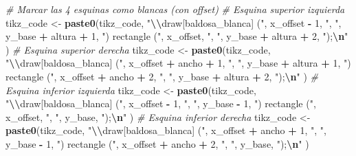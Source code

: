 \documentclass[
]{article}
\newenvironment{Shaded}{\begin{snugshade}}{\end{snugshade}}
\newcommand{\CommentTok}[1]{\textcolor[rgb]{0.56,0.35,0.01}{\textit{#1}}}
\newcommand{\DecValTok}[1]{\textcolor[rgb]{0.00,0.00,0.81}{#1}}
\newcommand{\FunctionTok}[1]{\textcolor[rgb]{0.13,0.29,0.53}{\textbf{#1}}}
\newcommand{\NormalTok}[1]{#1}
\newcommand{\OtherTok}[1]{\textcolor[rgb]{0.56,0.35,0.01}{#1}}
\newcommand{\SpecialCharTok}[1]{\textcolor[rgb]{0.81,0.36,0.00}{\textbf{#1}}}
\newcommand{\StringTok}[1]{\textcolor[rgb]{0.31,0.60,0.02}{#1}}
\begin{document}
\begin{Shaded}
\begin{Highlighting}[]
    \CommentTok{\# Marcar las 4 esquinas como blancas (con offset)}
    \CommentTok{\# Esquina superior izquierda}
\NormalTok{    tikz\_code }\OtherTok{\textless{}{-}} \FunctionTok{paste0}\NormalTok{(tikz\_code,}
      \StringTok{"}\SpecialCharTok{\textbackslash{}\textbackslash{}}\StringTok{draw[baldosa\_blanca] ("}\NormalTok{, x\_offset }\SpecialCharTok{{-}} \DecValTok{1}\NormalTok{, }\StringTok{", "}\NormalTok{, y\_base }\SpecialCharTok{+}\NormalTok{ altura }\SpecialCharTok{+} \DecValTok{1}\NormalTok{, }\StringTok{") rectangle ("}\NormalTok{, x\_offset, }\StringTok{", "}\NormalTok{, y\_base }\SpecialCharTok{+}\NormalTok{ altura }\SpecialCharTok{+} \DecValTok{2}\NormalTok{, }\StringTok{");}\SpecialCharTok{\textbackslash{}n}\StringTok{"}
\NormalTok{    )}
    \CommentTok{\# Esquina superior derecha}
\NormalTok{    tikz\_code }\OtherTok{\textless{}{-}} \FunctionTok{paste0}\NormalTok{(tikz\_code,}
      \StringTok{"}\SpecialCharTok{\textbackslash{}\textbackslash{}}\StringTok{draw[baldosa\_blanca] ("}\NormalTok{, x\_offset }\SpecialCharTok{+}\NormalTok{ ancho }\SpecialCharTok{+} \DecValTok{1}\NormalTok{, }\StringTok{", "}\NormalTok{, y\_base }\SpecialCharTok{+}\NormalTok{ altura }\SpecialCharTok{+} \DecValTok{1}\NormalTok{, }\StringTok{") rectangle ("}\NormalTok{, x\_offset }\SpecialCharTok{+}\NormalTok{ ancho }\SpecialCharTok{+} \DecValTok{2}\NormalTok{, }\StringTok{", "}\NormalTok{, y\_base }\SpecialCharTok{+}\NormalTok{ altura }\SpecialCharTok{+} \DecValTok{2}\NormalTok{, }\StringTok{");}\SpecialCharTok{\textbackslash{}n}\StringTok{"}
\NormalTok{    )}
    \CommentTok{\# Esquina inferior izquierda}
\NormalTok{    tikz\_code }\OtherTok{\textless{}{-}} \FunctionTok{paste0}\NormalTok{(tikz\_code,}
      \StringTok{"}\SpecialCharTok{\textbackslash{}\textbackslash{}}\StringTok{draw[baldosa\_blanca] ("}\NormalTok{, x\_offset }\SpecialCharTok{{-}} \DecValTok{1}\NormalTok{, }\StringTok{", "}\NormalTok{, y\_base }\SpecialCharTok{{-}} \DecValTok{1}\NormalTok{, }\StringTok{") rectangle ("}\NormalTok{, x\_offset, }\StringTok{", "}\NormalTok{, y\_base, }\StringTok{");}\SpecialCharTok{\textbackslash{}n}\StringTok{"}
\NormalTok{    )}
    \CommentTok{\# Esquina inferior derecha}
\NormalTok{    tikz\_code }\OtherTok{\textless{}{-}} \FunctionTok{paste0}\NormalTok{(tikz\_code,}
      \StringTok{"}\SpecialCharTok{\textbackslash{}\textbackslash{}}\StringTok{draw[baldosa\_blanca] ("}\NormalTok{, x\_offset }\SpecialCharTok{+}\NormalTok{ ancho }\SpecialCharTok{+} \DecValTok{1}\NormalTok{, }\StringTok{", "}\NormalTok{, y\_base }\SpecialCharTok{{-}} \DecValTok{1}\NormalTok{, }\StringTok{") rectangle ("}\NormalTok{, x\_offset }\SpecialCharTok{+}\NormalTok{ ancho }\SpecialCharTok{+} \DecValTok{2}\NormalTok{, }\StringTok{", "}\NormalTok{, y\_base, }\StringTok{");}\SpecialCharTok{\textbackslash{}n}\StringTok{"}
\NormalTok{    )}
    

\end{Highlighting}
\end{Shaded}
\end{document}
